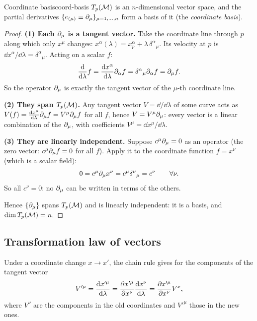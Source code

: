 \begin{theorem}{Coordinate basis}{coord-basis}
$T_p(\mathcal{M})$ is an $n$-dimensional vector space, and the partial derivatives $\{e_{(\mu)}\equiv\partial_\mu\}_{\mu=1,\dots,n}$ form a basis of it (the \emph{coordinate basis}).
\end{theorem}
\begin{proof}
\textbf{(1) Each $\partial_\mu$ is a tangent vector.} Take the coordinate line through $p$ along which only $x^\mu$ changes: $x^\alpha(\lambda)=x^\alpha_p+\lambda\,\delta^\alpha{}_\mu$. Its velocity at $p$ is $\dd x^\alpha/\dd\lambda=\delta^\alpha{}_\mu$. Acting on a scalar $f$:
\[
  \frac{\mathrm{d}}{\mathrm{d}\lambda}f=\frac{\mathrm{d} x^\alpha}{\mathrm{d}\lambda}\partial_\alpha f=\delta^\alpha{}_\mu\partial_\alpha f=\partial_\mu f .
\]
So the operator $\partial_\mu$ is exactly the tangent vector of the $\mu$-th coordinate line.

\textbf{(2) They span $T_p(\mathcal{M})$.} Any tangent vector $V=\dd/\dd\lambda$ of some curve acts as $V(f)=\frac{\mathrm{d} x^\mu}{\mathrm{d}\lambda}\partial_\mu f=V^\mu\partial_\mu f$ for all $f$, hence $V=V^\mu\partial_\mu$: every vector is a linear combination of the $\partial_\mu$, with coefficients $V^\mu=\dd x^\mu/\dd\lambda$.

\textbf{(3) They are linearly independent.} Suppose $c^\mu\partial_\mu=0$ as an operator (the zero vector: $c^\mu\partial_\mu f=0$ for all $f$). Apply it to the coordinate function $f=x^\nu$ (which is a scalar field):
\[
  0=c^\mu\partial_\mu x^\nu=c^\mu\delta^\nu{}_\mu=c^\nu\qquad\forall\nu .
\]
So all $c^\nu=0$: no $\partial_\mu$ can be written in terms of the others.

Hence $\{\partial_\mu\}$ spans $T_p(\mathcal{M})$ and is linearly independent: it is a basis, and $\dim T_p(\mathcal{M})=n$.
\end{proof}

\subsection{Transformation law of vectors}

Under a coordinate change $x\to x'$, the chain rule gives for the components of the tangent vector
\begin{equation}
  V'^\mu=\frac{\mathrm{d} x'^\mu}{\mathrm{d}\lambda}=\frac{\partial x'^\mu}{\partial x^\nu}\frac{\mathrm{d} x^\nu}{\mathrm{d}\lambda}=\frac{\partial x'^\mu}{\partial x^\nu}V^\nu ,
\end{equation}
where $V^\nu$ are the components in the old coordinates and $V'^\mu$ those in the new ones.

